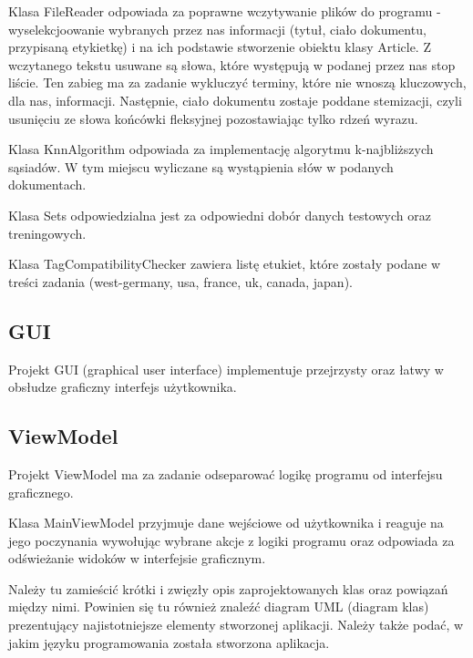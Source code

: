 \documentclass{classrep}
\begin{document}
		Klasa FileReader odpowiada za poprawne wczytywanie plików do programu - wyselekcjoowanie wybranych przez nas informacji (tytuł, ciało dokumentu, przypisaną etykietkę) i na ich podstawie stworzenie obiektu klasy Article. Z wczytanego tekstu usuwane są słowa, które występują w podanej przez nas stop liście. Ten zabieg ma za zadanie wykluczyć terminy, które nie wnoszą kluczowych, dla nas, informacji. Następnie, ciało dokumentu zostaje poddane stemizacji, czyli usunięciu ze słowa końcówki fleksyjnej pozostawiając tylko rdzeń wyrazu. \newline
		
		Klasa KnnAlgorithm odpowiada za implementację algorytmu k-najbliższych sąsiadów. W tym miejscu wyliczane są wystąpienia słów w podanych dokumentach. \newline
		
		Klasa Sets odpowiedzialna jest za odpowiedni dobór danych testowych oraz treningowych. \newline
		
		Klasa TagCompatibilityChecker zawiera listę etukiet, które zostały podane w treści zadania (west-germany, usa, france, uk, canada, japan).
		
		
	\subsection{GUI}
		Projekt GUI (graphical user interface) implementuje przejrzysty oraz łatwy w obsłudze graficzny interfejs użytkownika. 
		
	\subsection{ViewModel}
		Projekt ViewModel ma za zadanie odseparować logikę programu od interfejsu graficznego. \newline
		
		Klasa MainViewModel przyjmuje dane wejściowe od użytkownika i reaguje na jego poczynania wywołując wybrane akcje z logiki programu oraz odpowiada za odświeżanie widoków w interfejsie graficznym.  
		
		
		
	{\color{blue}
		Należy tu zamieścić krótki i zwięzły opis zaprojektowanych klas oraz powiązań
		między nimi. Powinien się tu również znaleźć diagram UML  (diagram klas)
		prezentujący najistotniejsze elementy stworzonej aplikacji. Należy także
		podać, w jakim języku programowania została stworzona aplikacja. }
	
\end{document}
